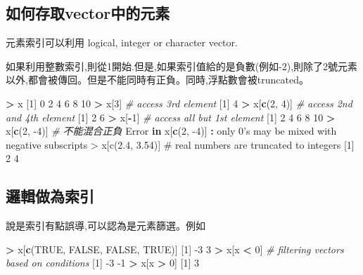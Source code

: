 \documentclass[]{book}
\newenvironment{Shaded}{\begin{snugshade}}{\end{snugshade}}
\newcommand{\CommentTok}[1]{\textcolor[rgb]{0.56,0.35,0.01}{\textit{#1}}}
\newcommand{\ControlFlowTok}[1]{\textcolor[rgb]{0.13,0.29,0.53}{\textbf{#1}}}
\newcommand{\DecValTok}[1]{\textcolor[rgb]{0.00,0.00,0.81}{#1}}
\newcommand{\KeywordTok}[1]{\textcolor[rgb]{0.13,0.29,0.53}{\textbf{#1}}}
\newcommand{\NormalTok}[1]{#1}
\newcommand{\OperatorTok}[1]{\textcolor[rgb]{0.81,0.36,0.00}{\textbf{#1}}}
\newcommand{\OtherTok}[1]{\textcolor[rgb]{0.56,0.35,0.01}{#1}}
\newcommand{\StringTok}[1]{\textcolor[rgb]{0.31,0.60,0.02}{#1}}
\theoremstyle{definition}
\theoremstyle{definition}
\theoremstyle{definition}
\theoremstyle{remark}
\begin{document}
\hypertarget{vector}{%
\subsection{如何存取vector中的元素}\label{vector}}

元素索引可以利用 logical, integer or character vector.

如果利用整數索引,則從1開始.但是,如果索引值給的是負數(例如-2),則除了2號元素以外,都會被傳回。但是不能同時有正負。同時,浮點數會被truncated。

\begin{Shaded}
\begin{Highlighting}[]
\OperatorTok{>}\StringTok{ }\NormalTok{x}
\NormalTok{[}\DecValTok{1}\NormalTok{]  }\DecValTok{0}  \DecValTok{2}  \DecValTok{4}  \DecValTok{6}  \DecValTok{8} \DecValTok{10}
\OperatorTok{>}\StringTok{ }\NormalTok{x[}\DecValTok{3}\NormalTok{]           }\CommentTok{# access 3rd element}
\NormalTok{[}\DecValTok{1}\NormalTok{] }\DecValTok{4}
\OperatorTok{>}\StringTok{ }\NormalTok{x[}\KeywordTok{c}\NormalTok{(}\DecValTok{2}\NormalTok{, }\DecValTok{4}\NormalTok{)]     }\CommentTok{# access 2nd and 4th element}
\NormalTok{[}\DecValTok{1}\NormalTok{] }\DecValTok{2} \DecValTok{6}
\OperatorTok{>}\StringTok{ }\NormalTok{x[}\OperatorTok{-}\DecValTok{1}\NormalTok{]          }\CommentTok{# access all but 1st element}
\NormalTok{[}\DecValTok{1}\NormalTok{]  }\DecValTok{2}  \DecValTok{4}  \DecValTok{6}  \DecValTok{8} \DecValTok{10}
\OperatorTok{>}\StringTok{ }\NormalTok{x[}\KeywordTok{c}\NormalTok{(}\DecValTok{2}\NormalTok{, }\DecValTok{-4}\NormalTok{)]    }\CommentTok{# 不能混合正負}
\NormalTok{Error }\ControlFlowTok{in}\NormalTok{ x[}\KeywordTok{c}\NormalTok{(}\DecValTok{2}\NormalTok{, }\DecValTok{-4}\NormalTok{)] }\OperatorTok{:}\StringTok{ }\NormalTok{only }\DecValTok{0}\StringTok{'s may be mixed with negative subscripts}
\StringTok{> x[c(2.4, 3.54)]    # real numbers are truncated to integers}
\StringTok{[1] 2 4}
\end{Highlighting}
\end{Shaded}

\subsection{邏輯做為索引}

說是索引有點誤導,可以認為是元素篩選。例如

\begin{Shaded}
\begin{Highlighting}[]
\OperatorTok{>}\StringTok{ }\NormalTok{x[}\KeywordTok{c}\NormalTok{(}\OtherTok{TRUE}\NormalTok{, }\OtherTok{FALSE}\NormalTok{, }\OtherTok{FALSE}\NormalTok{, }\OtherTok{TRUE}\NormalTok{)]}
\NormalTok{[}\DecValTok{1}\NormalTok{] }\DecValTok{-3}  \DecValTok{3}
\OperatorTok{>}\StringTok{ }\NormalTok{x[x }\OperatorTok{<}\StringTok{ }\DecValTok{0}\NormalTok{]  }\CommentTok{# filtering vectors based on conditions}
\NormalTok{[}\DecValTok{1}\NormalTok{] }\DecValTok{-3} \DecValTok{-1}
\OperatorTok{>}\StringTok{ }\NormalTok{x[x }\OperatorTok{>}\StringTok{ }\DecValTok{0}\NormalTok{]}
\NormalTok{[}\DecValTok{1}\NormalTok{] }\DecValTok{3}
\end{Highlighting}
\end{Shaded}
\end{document}
